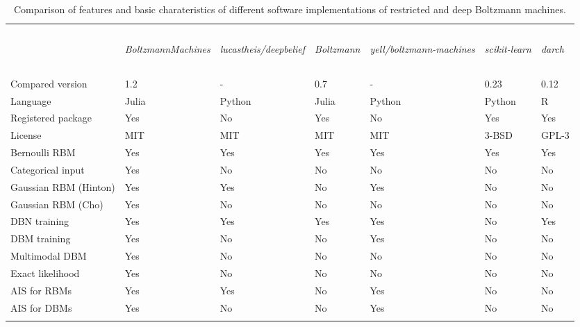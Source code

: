 \documentclass[12pt]{article}
\newcommand{\apkg}[1]{\emph{#1}}
\begin{document}
\begin{table}[h!]
\centering
\caption{\label{tab:FeatureOverviewBoltzmann} Comparison of features and basic charateristics of different software implementations of restricted and deep Boltzmann machines.}
\begin{tabular}{p{4.4cm} p{1.1cm} p{1.1cm} p{1.1cm} p{1.1cm} p{1.25cm} p{1.25cm}}
\hline \\ [3.9ex]\\
 & \begin{rotate}{25}\apkg{BoltzmannMachines} \end{rotate} &
 \begin{rotate}{25} \apkg{lucastheis/deepbelief} \end{rotate} &
 \begin{rotate}{25} \apkg{Boltzmann} \end{rotate} &
 \begin{rotate}{25} \apkg{yell/boltzmann-machines}  \end{rotate} &
 \begin{rotate}{25} \apkg{scikit-learn} \end{rotate} &
 \begin{rotate}{25} \apkg{darch} \end{rotate} \\
\hline
\\\\[-4\medskipamount]
Compared version & 1.2 & - & 0.7 & - & 0.23 & 0.12 \\
Language & Julia & Python & Julia & Python & Python & R \\
Registered package & Yes & No & Yes & No & Yes & Yes \\
License & MIT & MIT & MIT & MIT & 3-BSD & GPL-3 \\
Bernoulli RBM & Yes & Yes & Yes  & Yes & Yes & Yes \\
Categorical input & Yes & No & No & No & No & No \\
Gaussian RBM (Hinton) & Yes & Yes & No & Yes & No & No \\
Gaussian RBM (Cho) & Yes & No & No & No & No & No \\
DBN training & Yes & Yes & Yes & Yes & No & Yes \\
DBM training & Yes & No & No & Yes & No & No \\
Multimodal DBM & Yes & No & No & No & No & No \\
Exact likelihood & Yes & No & No & No & No & No \\
AIS for RBMs & Yes & Yes & No & Yes & No & No \\
AIS for DBMs & Yes & No & No & Yes & No & No \\
\\[-2\medskipamount]
\hline
\end{tabular}
\end{table}
\end{document}
